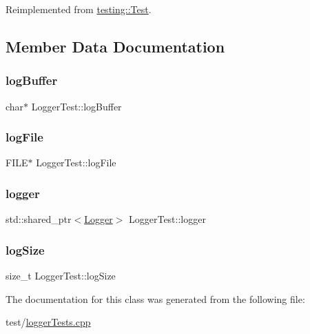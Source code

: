 Reimplemented from \mbox{\hyperlink{classtesting_1_1Test_a5f0ab439802cbe0ef7552f1a9f791923}{testing\+::\+Test}}.



\subsection{Member Data Documentation}
\mbox{\label{classLoggerTest_ad2b73d8c0b5fbcb8557326e0e3cff06a}} 
\subsubsection{\texorpdfstring{logBuffer}{logBuffer}}
{\footnotesize\ttfamily char$\ast$ Logger\+Test\+::log\+Buffer\hspace{0.3cm}{\ttfamily [protected]}}

\mbox{\label{classLoggerTest_a1890b91ba06a9e04127a11d47a5d96c6}} 
\subsubsection{\texorpdfstring{logFile}{logFile}}
{\footnotesize\ttfamily F\+I\+LE$\ast$ Logger\+Test\+::log\+File\hspace{0.3cm}{\ttfamily [protected]}}

\mbox{\label{classLoggerTest_a1f9b638cb5980d7dc4773d91288b027b}} 
\subsubsection{\texorpdfstring{logger}{logger}}
{\footnotesize\ttfamily std\+::shared\+\_\+ptr$<$\mbox{\hyperlink{classokapi_1_1Logger}{Logger}}$>$ Logger\+Test\+::logger\hspace{0.3cm}{\ttfamily [protected]}}

\mbox{\label{classLoggerTest_a035ac6f3d02c22ee6c6012eb4c45c1f8}} 
\subsubsection{\texorpdfstring{logSize}{logSize}}
{\footnotesize\ttfamily size\+\_\+t Logger\+Test\+::log\+Size\hspace{0.3cm}{\ttfamily [protected]}}



The documentation for this class was generated from the following file\+:\begin{DoxyCompactItemize}
\item 
test/\mbox{\hyperlink{loggerTests_8cpp}{logger\+Tests.\+cpp}}\end{DoxyCompactItemize}
